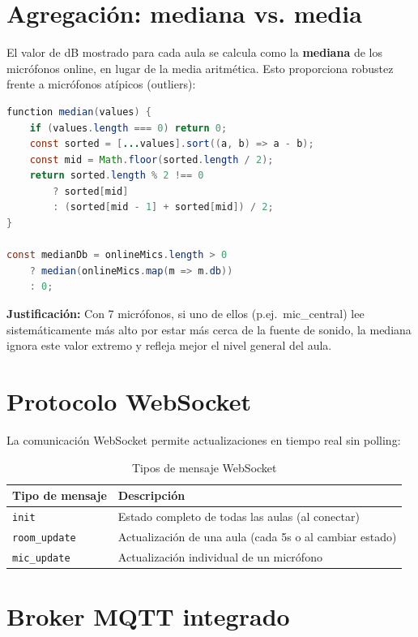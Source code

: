 \documentclass[12pt,a4paper]{report}
\begin{document}
\section{Agregaci\'on: mediana vs. media}

El valor de dB mostrado para cada aula se calcula como la \textbf{mediana} de los micr\'ofonos online, en lugar de la media aritm\'etica. Esto proporciona robustez frente a micr\'ofonos at\'ipicos (outliers):

\begin{lstlisting}[language=Java, caption={C\'alculo de mediana para agregaci\'on del aula}]
function median(values) {
    if (values.length === 0) return 0;
    const sorted = [...values].sort((a, b) => a - b);
    const mid = Math.floor(sorted.length / 2);
    return sorted.length % 2 !== 0
        ? sorted[mid]
        : (sorted[mid - 1] + sorted[mid]) / 2;
}

const medianDb = onlineMics.length > 0
    ? median(onlineMics.map(m => m.db))
    : 0;
\end{lstlisting}

\textbf{Justificaci\'on:} Con 7 micr\'ofonos, si uno de ellos (p.ej.\ mic\_central) lee sistem\'aticamente m\'as alto por estar m\'as cerca de la fuente de sonido, la mediana ignora este valor extremo y refleja mejor el nivel general del aula.

\section{Protocolo WebSocket}

La comunicaci\'on WebSocket permite actualizaciones en tiempo real sin polling:

\begin{table}[H]
\centering
\begin{tabularx}{\textwidth}{lX}
\toprule
\textbf{Tipo de mensaje} & \textbf{Descripci\'on} \\
\midrule
\texttt{init} & Estado completo de todas las aulas (al conectar) \\
\texttt{room\_update} & Actualizaci\'on de una aula (cada 5s o al cambiar estado) \\
\texttt{mic\_update} & Actualizaci\'on individual de un micr\'ofono \\
\bottomrule
\end{tabularx}
\caption{Tipos de mensaje WebSocket}
\end{table}

\section{Broker MQTT integrado}
\end{document}
